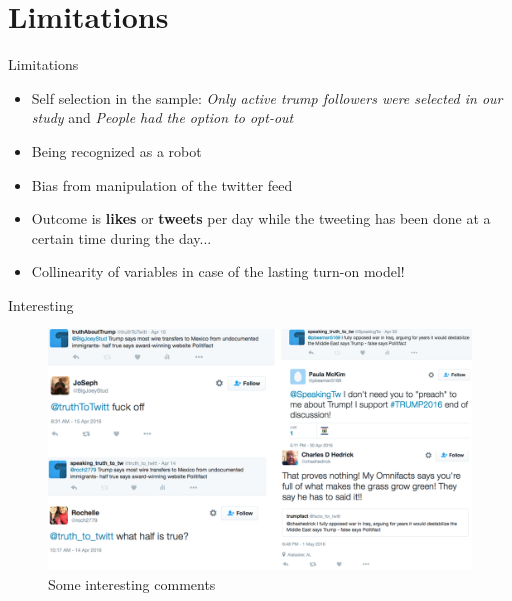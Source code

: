 \documentclass{beamer}
\begin{document}
\section{Limitations}
\begin{frame}{Limitations}
\begin{itemize}

\item Self selection in the sample: 
\textit{Only active trump followers were selected in our study} and \textit{People had the option to opt-out}
\item Being recognized as a robot
\item Bias from manipulation of the twitter feed
\item Outcome is \textbf{likes} or \textbf{tweets} per day while the tweeting has been done at a certain time during the day...
\item Collinearity of variables in case of the lasting turn-on model!
\end{itemize}
\end{frame}




\begin{frame}{Interesting}
		\begin{figure}
			\begin{centering}
  	\includegraphics[scale=.45]{twitter_comment.PNG}
  \caption{Some interesting comments}
			\end{centering}
		\end{figure}
\end{frame}
		
\end{document}
